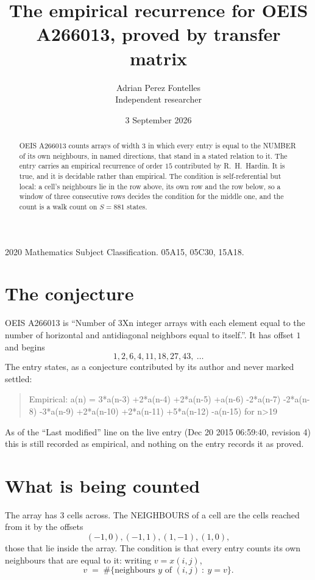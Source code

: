 \documentclass[11pt,a4paper]{article}
\title{The empirical recurrence for OEIS A266013, proved by transfer matrix}
\author{Adrian Perez Fontelles\\ \small Independent researcher}
\date{3 September 2026}
\theoremstyle{plain}
\theoremstyle{definition}
\begin{document}
\maketitle

\begin{abstract}
OEIS A266013 counts arrays of width $3$ in which every entry is equal to the NUMBER of its own
neighbours, in named directions, that stand in a stated relation to it. The entry carries an
empirical recurrence of order $15$ contributed by R.~H.~Hardin. It is true, and it is
decidable rather than empirical. The condition is self-referential but local: a cell's
neighbours lie in the row above, its own row and the row below, so a window of three
consecutive rows decides the condition for the middle one, and the count is a walk count on
$S=881$ states.
\end{abstract}

\noindent\small 2020 Mathematics Subject Classification. 05A15, 05C30, 15A18.\normalsize

\section{The conjecture}

OEIS A266013 is ``Number of 3Xn integer arrays with each element equal to the number of horizontal and antidiagonal neighbors equal to itself.''. It has offset $1$ and begins
\[
1, 2, 6, 4, 11, 18, 27, 43,\ \dots
\]
The entry states, as a conjecture contributed by its author and never marked settled:
\begin{quote}
Empirical: a(n) = 3*a(n-3) +2*a(n-4) +2*a(n-5) +a(n-6) -2*a(n-7) -2*a(n-8) -3*a(n-9) +2*a(n-10) +2*a(n-11) +5*a(n-12) -a(n-15) for n>19
\end{quote}
As of the ``Last modified'' line on the live entry (Dec 20 2015 06:59:40, revision 4) this is still
recorded as empirical, and nothing on the entry records it as proved.

\section{What is being counted}

The array has $3$ cells across. The NEIGHBOURS of a cell are the cells reached from it by the
offsets
\[
(-1,0), (-1,1), (1,-1), (1,0),
\]
those that lie inside the array. The condition is that every entry counts its own neighbours
that are equal to it: writing $v=x(i,j)$,
\[
v\;=\;\#\{\text{neighbours } y \text{ of } (i,j)\ :\ y=v\} .
\]
\end{document}
